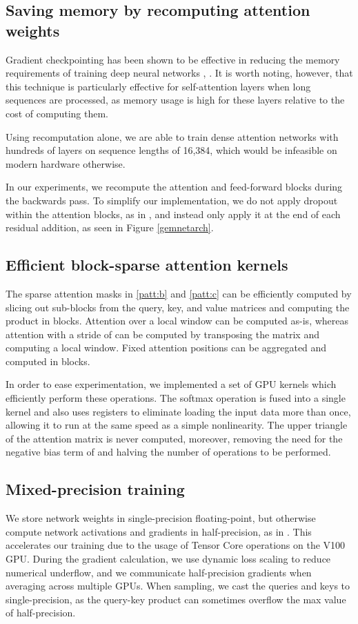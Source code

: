 \documentclass{article}
\begin{document}
\subsection{Saving memory by recomputing attention weights}
Gradient checkpointing has been shown to be effective in reducing the memory requirements of training deep neural networks \cite{chen2016training}, \cite{gruslys2016memory}. It is worth noting, however, that this technique is particularly effective for self-attention layers when long sequences are processed, as memory usage is high for these layers relative to the cost of computing them.

Using recomputation alone, we are able to train dense attention networks with hundreds of layers on sequence lengths of 16,384, which would be infeasible on modern hardware otherwise.

In our experiments, we recompute the attention and feed-forward blocks during the backwards pass. To simplify our implementation, we do not apply dropout within the attention blocks, as in \cite{vaswani2017attention}, and instead only apply it at the end of each residual addition, as seen in Figure \ref{gemnetarch}.

\subsection{Efficient block-sparse attention kernels}
The sparse attention masks in \ref{patt:b} and \ref{patt:c} can be efficiently computed by slicing out sub-blocks from the query, key, and value matrices and computing the product in blocks. Attention over a local window can be computed as-is, whereas attention with a stride of  can be computed by transposing the matrix and computing a local window. Fixed attention positions can be aggregated and computed in blocks.

In order to ease experimentation, we implemented a set of GPU kernels which efficiently perform these operations. The softmax operation is fused into a single kernel and also uses registers to eliminate loading the input data more than once, allowing it to run at the same speed as a simple nonlinearity. The upper triangle of the attention matrix is never computed, moreover, removing the need for the negative bias term of \cite{vaswani2017attention} and halving the number of operations to be performed.

\subsection{Mixed-precision training}
We store network weights in single-precision floating-point, but otherwise compute network activations and gradients in half-precision, as in \cite{micikevicius2017mixed}. This accelerates our training due to the usage of Tensor Core operations on the V100 GPU. During the gradient calculation, we use dynamic loss scaling to reduce numerical underflow, and we communicate half-precision gradients when averaging across multiple GPUs. When sampling, we cast the queries and keys to single-precision, as the query-key product can sometimes overflow the max value of half-precision.
\end{document}

